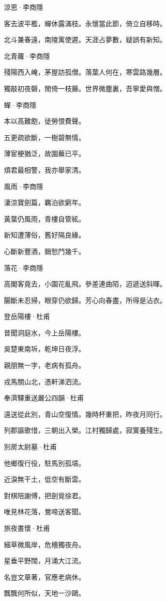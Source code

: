 \documentclass[12pt,a4paper]{ctexbook}
\begin{document}
涼思·李商隱\par
客去波平檻，蟬休露滿枝。永懷當此節，倚立自移時。\par
北斗兼春遠，南陵寓使遲。天涯占夢數，疑誤有新知。\par
北青蘿·李商隱\par
殘陽西入崦，茅屋訪孤僧。落葉人何在，寒雲路幾層。\par
獨敲初夜磬，閒倚一枝藤。世界微塵裏，吾寧愛與憎。\par
蟬·李商隱\par
本以高難飽，徒勞恨費聲。\par
五更疏欲斷，一樹碧無情。\par
薄宦梗猶泛，故園蕪已平。\par
煩君最相警，我亦舉家清。\par
風雨·李商隱\par
淒涼寶劍篇，羈泊欲窮年。\par
黃葉仍風雨，青樓自管絃。\par
新知遭薄俗，舊好隔良緣。\par
心斷新豐酒，銷愁鬥幾千。\par
落花·李商隱\par
高閣客竟去，小園花亂飛。參差連曲陌，迢遞送斜暉。\par
腸斷未忍掃，眼穿仍欲歸。芳心向春盡，所得是沾衣。\par
登岳陽樓·杜甫\par
昔聞洞庭水，今上岳陽樓。\par
吳楚東南坼，乾坤日夜浮。\par
親朋無一字，老病有孤舟。\par
戎馬關山北，憑軒涕泗流。\par
奉濟驛重送嚴公四韻·杜甫\par
遠送從此別，青山空復情。幾時杯重把，昨夜月同行。\par
列郡謳歌惜，三朝出入榮。江村獨歸處，寂寞養殘生。\par
別房太尉墓·杜甫\par
他鄉復行役，駐馬別孤墳。\par
近淚無干土，低空有斷雲。\par
對棋陪謝傅，把劍覓徐君。\par
唯見林花落，鶯啼送客聞。\par
旅夜書懷·杜甫\par
細草微風岸，危檣獨夜舟。\par
星垂平野闊，月涌大江流。\par
名豈文章著，官應老病休。\par
飄飄何所似，天地一沙鷗。\par
\end{document}

